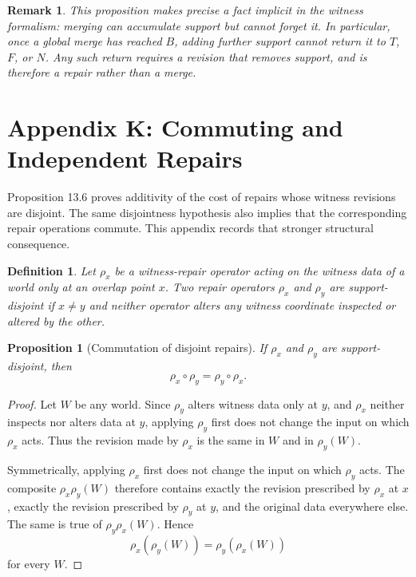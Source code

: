 \documentclass[11pt]{book}
\newtheorem*{appendixdefinition}{Definition}
\newtheorem*{appendixproposition}{Proposition}
\newtheorem*{appendixremark}{Remark}
\begin{document}
\begin{appendixremark}
This proposition makes precise a fact implicit in the witness formalism:
merging can accumulate support but cannot forget it. In particular, once
a global merge has reached $B$, adding further support cannot return it
to $T$, $F$, or $N$. Any such return requires a revision that removes
support, and is therefore a repair rather than a merge.
\end{appendixremark}


\chapter*{Appendix K: Commuting and Independent Repairs}

Proposition 13.6 proves additivity of the cost of repairs whose witness
revisions are disjoint. The same disjointness hypothesis also implies
that the corresponding repair operations commute. This appendix records
that stronger structural consequence.

\begin{appendixdefinition}
Let $\rho_x$ be a witness-repair operator acting on the witness data of a
world only at an overlap point $x$. Two repair operators $\rho_x$ and
$\rho_y$ are \emph{support-disjoint} if $x\neq y$ and neither operator
alters any witness coordinate inspected or altered by the other.
\end{appendixdefinition}

\begin{appendixproposition}[Commutation of disjoint repairs]
If $\rho_x$ and $\rho_y$ are support-disjoint, then
\[
\rho_x\circ\rho_y
=
\rho_y\circ\rho_x.
\]
\end{appendixproposition}

\begin{proof}
Let $W$ be any world. Since $\rho_y$ alters witness data only at $y$, and
$\rho_x$ neither inspects nor alters data at $y$, applying $\rho_y$ first
does not change the input on which $\rho_x$ acts. Thus the revision made
by $\rho_x$ is the same in $W$ and in $\rho_y(W)$.

Symmetrically, applying $\rho_x$ first does not change the input on which
$\rho_y$ acts. The composite $\rho_x\rho_y(W)$ therefore contains exactly
the revision prescribed by $\rho_x$ at $x$, exactly the revision
prescribed by $\rho_y$ at $y$, and the original data everywhere else.
The same is true of $\rho_y\rho_x(W)$. Hence
\[
\rho_x(\rho_y(W))
=
\rho_y(\rho_x(W))
\]
for every $W$.
\end{proof}
\end{document}
